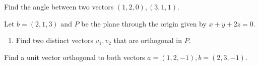 \documentclass[openany]{book}
\begin{document}
\newpage
\begin{prob}
    Find the angle between two vectors $(1,2,0), (3,1,1)$.
\end{prob}
\newpage
\newpage
\begin{prob}
    Let $b=(2,1,3)$ and $P$ be the plane through the origin given by $x+y+2z=0$. 
    \begin{enumerate}
        \item[(a)] Find two distinct vectors $v_1,v_2$ that are orthogonal in $P$.
    \end{enumerate}
\end{prob}
\newpage


\begin{prob}
    Find a unit vector orthogonal to both vectors $a=(1,2,-1), b=(2,3,-1)$.
\end{prob}
\end{document}
